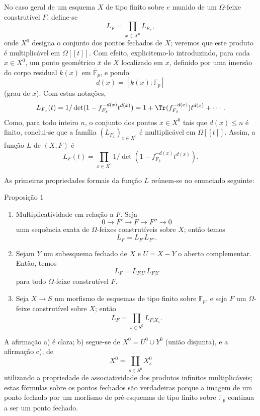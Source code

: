 No caso geral de um esquema $X$ de tipo finito sobre $e$ munido de um $\Omega$-feixe construtível $F$, define-se
\[
L_F=\prod_{x\in X^0}L_{F_x},
\]
onde $X^0$ designa o conjunto dos pontos fechados de $X$; veremos que este produto é multiplicável em $\Omega[[t]]$. Com efeito, explicitemo-lo introduzindo, para cada $x\in X^0$, um ponto geométrico $\bar x$ de $X$ localizado em $x$, definido por uma imersão do corpo residual $k(x)$ em $\bar{\mathbb F}_p$, e pondo
\[
d(x)=[k(x):\mathbb F_p]
\]
(grau de $x$). Com estas notações,
\[
L_{F_x}(t)=1/\det(1-f_{F_{\bar x}}^{-d(x)}t^{d(x)})
 =1+\Tr(f_{F_{\bar x}}^{-d(x)})t^{d(x)}+\cdots .
\]
Como, para todo inteiro $n$, o conjunto dos pontos $x\in X^0$ tais que $d(x)\le n$ é finito, conclui-se que a família $(L_{F_x})_{x\in X^0}$ é multiplicável em $\Omega[[t]]$. Assim, a função $L$ de $(X,F)$ é
\[
L_F(t)=\prod_{x\in X^0}1/\det(1-f_{F_{\bar x}}^{-d(x)}t^{d(x)}).
\]

As primeiras propriedades formais da função $L$ reúnem-se no enunciado seguinte:

\begin{statement}{Proposição 1}
\begin{enumerate}[label=\alph*)]
\item Multiplicatividade em relação a $F$. Seja
\[
0\longrightarrow F'\longrightarrow F\longrightarrow F''\longrightarrow0
\]
uma sequência exata de $\Omega$-feixes construtíveis sobre $X$; então temos
\[
L_F=L_{F'}L_{F''}.
\]
\item Sejam $Y$ um subesquema fechado de $X$ e $U=X-Y$ o aberto complementar. Então, temos
\[
L_F=L_{F|U}\,L_{F|Y}
\]
para todo $\Omega$-feixe construtível $F$.
\item Seja $X\to S$ um morfismo de esquemas de tipo finito sobre $\mathbb F_p$, e seja $F$ um $\Omega$-feixe construtível sobre $X$; então
\[
L_F=\prod_{s\in S^0}L_{F|X_s}.
\]
\end{enumerate}
\end{statement}

A afirmação a) é clara; b) segue-se de $X^0=U^0\cup Y^0$ (união disjunta), e a afirmação c), de
\[
X^0=\coprod_{s\in S^0}X_s^0
\]
utilizando a propriedade de associatividade dos produtos infinitos multiplicáveis; estas fórmulas sobre os pontos fechados são verdadeiras porque a imagem de um ponto fechado por um morfismo de pré-esquemas de tipo finito sobre $\mathbb F_p$ continua a ser um ponto fechado.
